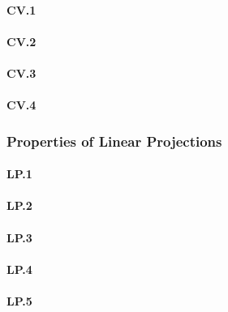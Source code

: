 \documentclass[11pt, oneside, a4paper, article]{article}
\numberwithin{equation}{section}
\begin{document}
\paragraph{CV.1}

\paragraph{CV.2}

\paragraph{CV.3}

\paragraph{CV.4}

\subsubsection{Properties of Linear Projections}


\paragraph{LP.1}

\paragraph{LP.2}

\paragraph{LP.3}

\paragraph{LP.4}

\paragraph{LP.5}
\end{document}
